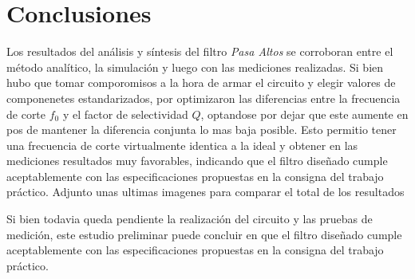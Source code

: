 \section*{Conclusiones}
\vspace{2ex}
Los resultados del an\'alisis y s\'intesis del filtro \textit{Pasa Altos} se corroboran entre el m\'etodo anal\'itico, la simulaci\'on y luego con las mediciones realizadas. Si bien hubo que tomar comporomisos a la hora de armar el circuito y elegir valores de componenetes estandarizados, por optimizaron las diferencias entre la frecuencia de corte $f_0$ y el factor de selectividad $Q$, optandose por dejar que este aumente en pos de mantener la diferencia conjunta lo mas baja posible. Esto permitio tener una frecuencia de corte virtualmente identica a la ideal y obtener en las mediciones resultados muy favorables, indicando que el filtro diseñado cumple aceptablemente con las especificaciones propuestas en la consigna del trabajo pr\'actico. Adjunto unas ultimas imagenes para comparar el total de los resultados






 Si bien todavia queda pendiente la realizaci\'on del circuito y las pruebas de medici\'on, este estudio preliminar puede concluir en que el filtro diseñado cumple aceptablemente con las especificaciones propuestas en la consigna del trabajo pr\'actico.

